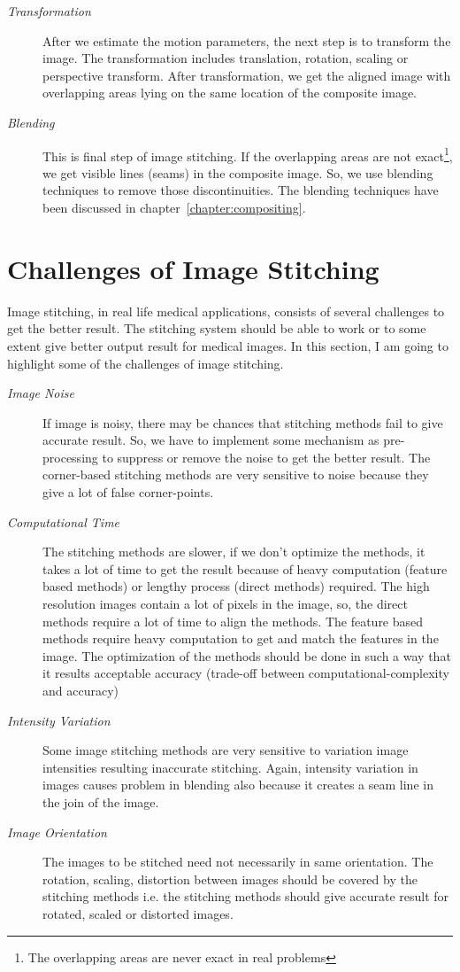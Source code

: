 \begin{description}
\item [\textit{Transformation}]
After we estimate the motion parameters, the next step is to transform the image. The transformation includes translation, rotation, scaling or perspective transform. After transformation, we get the aligned image with overlapping areas lying on the same location of the composite image.  
\item [\textit{Blending}]
This is final step of image stitching. If the overlapping areas are not exact\footnote{The overlapping areas are never exact in real problems}, we get visible lines (seams) in the composite image. So, we use blending techniques to remove those discontinuities. The blending techniques have been discussed in chapter~\ref{chapter:compositing}.
\end{description}



\section{Challenges of Image Stitching}
Image stitching, in real life medical applications, consists of several challenges to get the better result. The stitching system should be able to work or to some extent give better output result for medical images. In this section, I am going to highlight some of the challenges of image stitching.
\begin{description}
  \item [\textit{Image Noise}]{If image is noisy, there may be chances that stitching methods fail to give accurate result. So, we have to implement some mechanism as pre-processing to suppress or remove the noise to get the better result. The corner-based stitching methods are very sensitive to noise because they give a lot of false corner-points.}
	\item [\textit{Computational Time}]{The stitching methods are slower, if we don't optimize the methods, it takes a lot of time to get the result because of heavy computation (feature based methods) or lengthy process (direct methods) required. The high resolution images contain a lot of pixels in the image, so, the direct methods require a lot of time to align the methods. The feature based methods require heavy computation to get and match the features in the image. The optimization of the methods should be done in such a way that it results acceptable accuracy (trade-off between computational-complexity and accuracy)}
	\item [\textit{Intensity Variation}]{Some image stitching methods are very sensitive to variation image intensities resulting inaccurate stitching. Again, intensity variation in images causes problem in blending also because it creates a seam line in the join of the image.}
	\item [\textit{Image Orientation}]{The images to be stitched need not necessarily in same orientation. The rotation, scaling, distortion between images should be covered by the stitching methods i.e. the stitching methods should give accurate result for rotated, scaled or distorted images.}	
\end{description}

